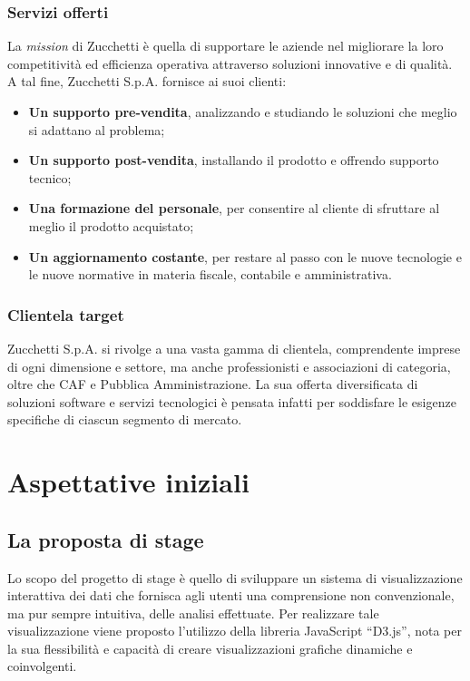 \subsubsection{Servizi offerti}
La \emph{mission} di Zucchetti è quella di supportare le aziende nel migliorare
la loro competitività ed efficienza operativa attraverso soluzioni innovative e 
di qualità.
A tal fine, Zucchetti S.p.A. fornisce ai suoi clienti:
\begin{itemize}
    \item \textbf{Un supporto pre-vendita}, analizzando e studiando le soluzioni 
    che meglio si adattano al problema;
    \item \textbf{Un supporto post-vendita}, installando il prodotto e 
    offrendo supporto tecnico;
    \item \textbf{Una formazione del personale}, per consentire al cliente di 
    sfruttare al meglio il prodotto acquistato;
    \item \textbf{Un aggiornamento costante}, per restare al passo con le nuove
    tecnologie e le nuove normative in materia fiscale, contabile e amministrativa.
\end{itemize} 

\subsubsection{Clientela target}
Zucchetti S.p.A. si rivolge a una vasta gamma di clientela, comprendente imprese
di ogni dimensione e settore, ma anche professionisti e associazioni di categoria, 
oltre che CAF e Pubblica Amministrazione. 
La sua offerta diversificata di soluzioni software e servizi tecnologici è pensata 
infatti per soddisfare le esigenze specifiche di ciascun segmento di mercato.


\section{Aspettative iniziali}
\subsection{La proposta di stage}
Lo scopo del progetto di stage è quello di sviluppare un sistema di visualizzazione interattiva dei dati che 
fornisca agli utenti una comprensione non convenzionale, ma pur sempre intuitiva, delle analisi effettuate. 
Per realizzare tale visualizzazione viene proposto l'utilizzo della libreria JavaScript ``D3.js'', nota per la 
sua flessibilità e capacità di creare visualizzazioni grafiche dinamiche e coinvolgenti.


